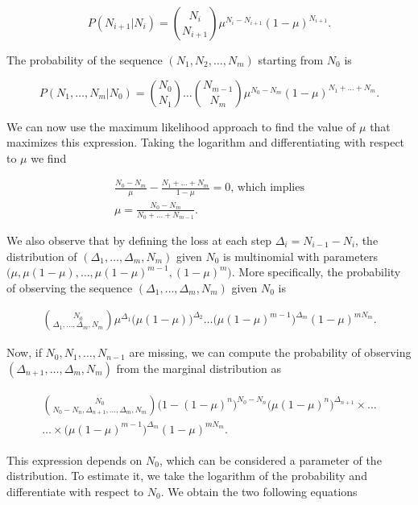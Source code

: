 \documentclass{article}
\begin{document}
\begin{equation*}
P(N_{i+1}|N_i) = {N_i \choose N_{i+1}}
\mu^{N_i-N_{i+1}}(1-\mu)^{N_{i+1}}.
\end{equation*}

The probability of the sequence $(N_1, N_2, \ldots,
N_m)$ starting from $N_0$ is

\begin{equation*}
P(N_1, \ldots, N_m|N_0) = 
{N_0 \choose N_1 } \ldots {N_{m-1} \choose N_m }
\mu^{N_0-N_m}(1-\mu)^{N_1+\ldots+N_m}.
\end{equation*}

We can now use the maximum likelihood approach to find the value of
$\mu$ that maximizes this expression. Taking the logarithm and
differentiating with respect to $\mu$ we find

\begin{gather*}
\frac{N_0-N_m}{\mu}-\frac{N_1+\ldots+N_m}{1-\mu} = 0
\text{, which implies} \\
\mu = \frac{N_0-N_m}{N_0+\ldots+N_{m-1}}.
\end{gather*}

We also observe that by defining the loss at each step $\Delta_i = N_{i-1}
- N_i$, the distribution of $(\Delta_1, \ldots, \Delta_m, N_m)$ given
$N_0$ is multinomial with parameters $\big(\mu, \mu(1-\mu),
\ldots, \mu(1-\mu)^{m-1}, (1-\mu)^m\big)$. More specifically, the
probability of observing the sequence $(\Delta_1, \ldots, \Delta_m, N_m)$
given $N_0$ is

\begin{align*}
{N_0 \choose \Delta_1, \ldots, \Delta_m, N_m}
\mu^{\Delta_1}\big(\mu(1-\mu)\big)^{\Delta_2}
\ldots \big(\mu(1-\mu)^{m-1}\big)^{\Delta_m}(1-\mu)^{mN_m}.
\end{align*}

Now, if $N_0, N_1, \ldots, N_{n-1}$ are missing, we can compute the
probability of observing $(\Delta_{n+1}, \ldots, \Delta_m, N_m)$ from the
marginal distribution as

\begin{align*}
\begin{split}
{N_0 \choose N_0-N_n, \Delta_{n+1}, \ldots, \Delta_m, N_m}
\big(1-(1-\mu)^n\big)^{N_0-N_n}
\big(\mu(1-\mu)^n\big)^{\Delta_{n+1}} \times
\ldots \\
\ldots \times
\big(\mu(1-\mu)^{m-1}\big)^{\Delta_m}(1-\mu)^{mN_m}.
\end{split}
\end{align*}

This expression depends on $N_0$, which can be considered a parameter of
the distribution. To estimate it, we take the logarithm of the probability
and differentiate with respect to $N_0$. We obtain the two following
equations
\end{document}
